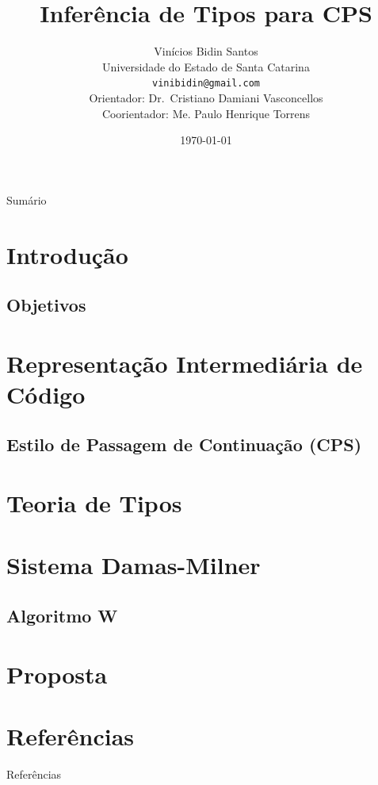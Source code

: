 \documentclass[xcolor=table]{beamer}
\title{Inferência de Tipos para CPS}
\author[Vinícios Bidin]{
    Vinícios Bidin Santos\\\smallskip
    {\scriptsize Universidade do Estado de Santa Catarina \\\smallskip
    \texttt{vinibidin@gmail.com}\\\medskip
    {Orientador: Dr.~Cristiano Damiani Vasconcellos}\\
    {Coorientador: Me. Paulo Henrique Torrens}\\
    }
}
\date{\today}
\begin{document}
\begin{frame}
    \titlepage%
\end{frame}

\begin{frame}[allowframebreaks]{Sumário}
    \tableofcontents
\end{frame}

\section[]{Introdução}

\subsection[]{Objetivos}


\section[]{Representação Intermediária de Código}

\subsection{Estilo de Passagem de Continuação (CPS)}


\section[]{Teoria de Tipos}


\section[]{Sistema Damas-Milner}

\subsection{Algoritmo W}


\section[]{Proposta}



\section[]{Referências}
\begin{frame}[allowframebreaks]{Referências}
    
\end{frame}
\end{document}
